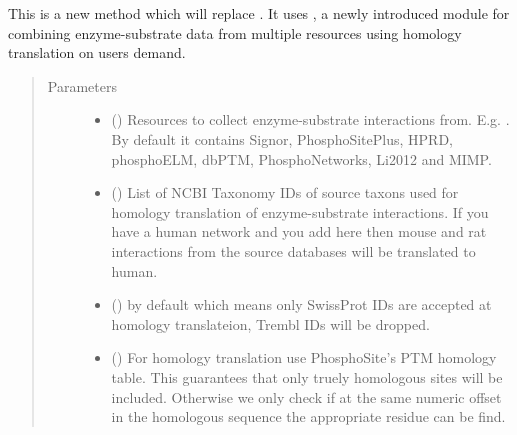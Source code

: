 \documentclass[letterpaper,10pt,english]{sphinxmanual}
\begin{document}
\begin{fulllineitems}
\begin{fulllineitems}
\label{\detokenize{reference:pypath.main.PyPath.load_ptms2}}
This is a new method which will replace .
It uses , a newly introduced
module for combining enzyme-substrate data from multiple
resources using homology translation on users demand.
\begin{quote}\begin{description}
\item[{Parameters}] \leavevmode\begin{itemize}
\item {} 
 () \textendash{} Resources to collect enzyme-substrate
interactions from. E.g. . By default
it contains Signor, PhosphoSitePlus, HPRD, phosphoELM, dbPTM,
PhosphoNetworks, Li2012 and MIMP.

\item {} 
 () \textendash{} List of NCBI Taxonomy IDs of
source taxons used for homology translation of enzyme-substrate
interactions. If you have a human network and you add here
\sphinxtitleref{{[}10090, 10116{]}} then mouse and rat interactions from the source
databases will be translated to human.

\item {} 
 () \textendash{}  by default which means
only SwissProt IDs are accepted at homology translateion, Trembl
IDs will be dropped.

\item {} 
 () \textendash{} For homology translation use
PhosphoSite’s PTM homology table. This guarantees that only
truely homologous sites will be included. Otherwise we only
check if at the same numeric offset in the homologous sequence
the appropriate residue can be find.


\end{itemize}
\end{description}
\end{quote}
\end{fulllineitems}
\end{fulllineitems}
\end{document}
